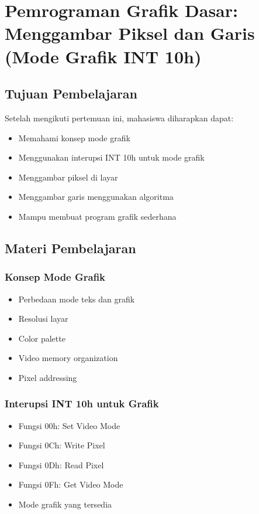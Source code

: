 \chapter{Pemrograman Grafik Dasar: Menggambar Piksel dan Garis (Mode Grafik INT 10h)}

\section{Tujuan Pembelajaran}
Setelah mengikuti pertemuan ini, mahasiswa diharapkan dapat:
\begin{itemize}
\item Memahami konsep mode grafik
\item Menggunakan interupsi INT 10h untuk mode grafik
\item Menggambar piksel di layar
\item Menggambar garis menggunakan algoritma
\item Mampu membuat program grafik sederhana
\end{itemize}

\section{Materi Pembelajaran}

\subsection{Konsep Mode Grafik}
\begin{itemize}
\item Perbedaan mode teks dan grafik
\item Resolusi layar
\item Color palette
\item Video memory organization
\item Pixel addressing
\end{itemize}

\subsection{Interupsi INT 10h untuk Grafik}
\begin{itemize}
\item Fungsi 00h: Set Video Mode
\item Fungsi 0Ch: Write Pixel
\item Fungsi 0Dh: Read Pixel
\item Fungsi 0Fh: Get Video Mode
\item Mode grafik yang tersedia
\end{itemize}

